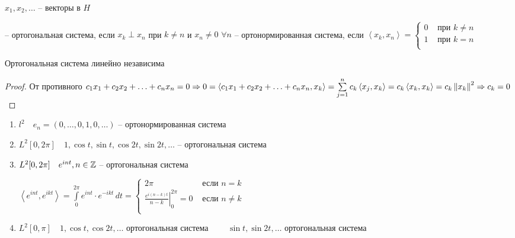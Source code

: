 \begin{definition}\thmslashn
	
	$x_ 1, x_2, \ldots$ -- векторы в $H$
	
	-- ортогональная система, если $x_k \perp x_n$ при $k\not = n$ и $x_n \not = 0\,\,\forall n$
	-- ортонормированная система, если $\left\langle x_k, x_n \right\rangle  = \begin{cases}
	0 & \text{ при } k\not = n\\
	1 & \text{ при } k = n\\
	\end{cases}$

\end{definition}

\begin{remark}\thmslashn
	
	Ортогональная система линейно независима
	
\end{remark}

\begin{proof}\thmslashn
	
	От противного $c_1x_1 + c_2 x_2 + \ldots + c_nx_n = 0 \Rightarrow 0 = \left\langle c_1x_1 + c_2 x_2 + \ldots + c_nx_n, x_k \right\rangle = \sum\limits_{j = 1}^nc_k  \left\langle x_j, x_k \right\rangle = c_k\left\langle x_k, x_k \right\rangle = c_k\left\|x_k\right\|^2 \Rightarrow c_k = 0$
	
\end{proof}

\begin{example}\thmslashn
	
	\begin{enumerate}
		\item 
		$l^2\quad e_n = (0, \ldots, 0, 1, 0, \ldots)$ -- ортонормированная система
		
		\item
		$L^2[0, 2\pi]\quad 1, \cos t, \sin t, \cos 2t, \sin 2t, \ldots$ -- ортогональная система
		
		
		\item
		$L^2[0, 2\pi]\quad e^{int}, n\in \mathbb{Z}$ -- ортогональная система
		
		$\left\langle e^{int}, e^{ikt} \right\rangle = \int\limits_{0}^{2\pi} e^{int}\cdot e^{-ikt}\,dt = \begin{cases}
		2\pi & \text{ если } n = k\\
		\left. \frac{e^{i(n-k)t}}{n-k}\right|_{0}^{2\pi} = 0 & \text{ если } n \not= k\\
		\end{cases}$
		
		\item
		$L^2[0, \pi] \quad 1, \cos t, \cos 2t, \ldots$ ортогональная система
		$\quad\quad \sin t, \sin 2t, \ldots$ ортогональная система
	\end{enumerate}
	
\end{example}

